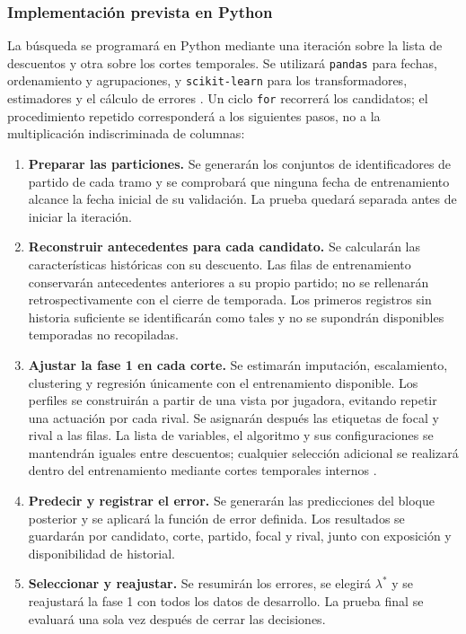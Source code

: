 \subsubsection*{Implementación prevista en Python}
La búsqueda se programará en Python mediante una iteración sobre la lista de descuentos y otra sobre los cortes temporales. Se utilizará \texttt{pandas} para fechas, ordenamiento y agrupaciones, y \texttt{scikit-learn} para los transformadores, estimadores y el cálculo de errores \cite{pandasOrdenTemporal,sklearnMAETemporal}. Un ciclo \texttt{for} recorrerá los candidatos; el procedimiento repetido corresponderá a los siguientes pasos, no a la multiplicación indiscriminada de columnas:
\begin{enumerate}
\item \textbf{Preparar las particiones.} Se generarán los conjuntos de identificadores de partido de cada tramo y se comprobará que ninguna fecha de entrenamiento alcance la fecha inicial de su validación. La prueba quedará separada antes de iniciar la iteración.
\item \textbf{Reconstruir antecedentes para cada candidato.} Se calcularán las características históricas con su descuento. Las filas de entrenamiento conservarán antecedentes anteriores a su propio partido; no se rellenarán retrospectivamente con el cierre de temporada. Los primeros registros sin historia suficiente se identificarán como tales y no se supondrán disponibles temporadas no recopiladas.
\item \textbf{Ajustar la fase 1 en cada corte.} Se estimarán imputación, escalamiento, clustering y regresión únicamente con el entrenamiento disponible. Los perfiles se construirán a partir de una vista por jugadora, evitando repetir una actuación por cada rival. Se asignarán después las etiquetas de focal y rival a las filas. La lista de variables, el algoritmo y sus configuraciones se mantendrán iguales entre descuentos; cualquier selección adicional se realizará dentro del entrenamiento mediante cortes temporales internos \cite{sklearnCommonPitfallsPonderacion}.
\item \textbf{Predecir y registrar el error.} Se generarán las predicciones del bloque posterior y se aplicará la función de error definida. Los resultados se guardarán por candidato, corte, partido, focal y rival, junto con exposición y disponibilidad de historial.
\item \textbf{Seleccionar y reajustar.} Se resumirán los errores, se elegirá $\lambda^*$ y se reajustará la fase 1 con todos los datos de desarrollo. La prueba final se evaluará una sola vez después de cerrar las decisiones.
\end{enumerate}

